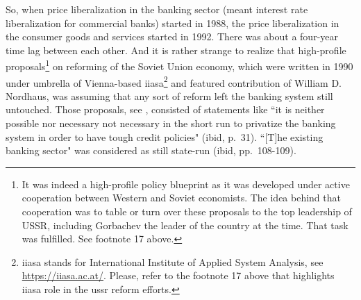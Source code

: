 So, when price liberalization in the banking sector (meant interest rate liberalization for commercial banks) started in 1988, the price liberalization in the consumer goods and services started in 1992. There was about a four-year time lag between each other. And it is rather strange to realize that high-profile proposals\footnote{It was indeed a high-profile policy blueprint as it was developed under active cooperation between Western and Soviet economists. The idea behind that cooperation was to table or turn over these proposals to the top leadership of USSR, including Gorbachev the leader of the country at the time. That task was fulfilled. See footnote 17 above.} on reforming of the Soviet Union economy, which were written in 1990 under umbrella of Vienna-based \ac{iiasa}\footnote{\ac{iiasa} stands for International Institute of Applied System Analysis, see \url{https://iiasa.ac.at/}. Please, refer to the footnote 17 above that highlights \ac{iiasa} role in the \ac{ussr} reform efforts.} and featured contribution of William D. Nordhaus, was assuming that any sort of reform left the banking system still untouched. Those proposals, see \cite{peck1991}, consisted of statements like ``it is neither possible nor necessary not necessary in the short run to privatize the banking system in order to have tough credit policies" (ibid, p.~31). ``[T]he existing banking sector" was considered as still state-run (ibid, pp.~108-109).

